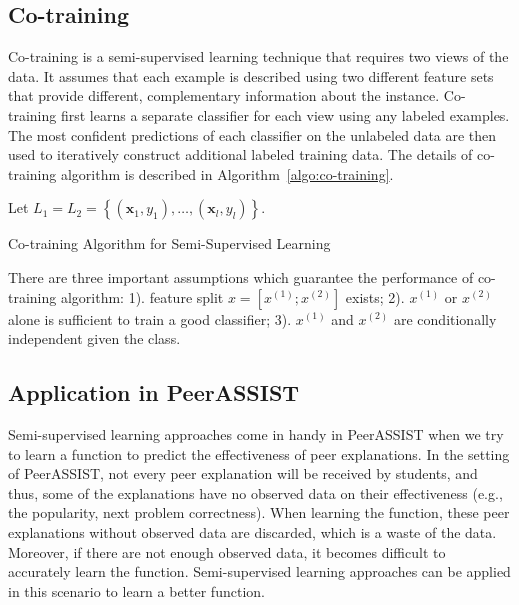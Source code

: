 \documentclass{article}
\begin{document}
\subsection{Co-training}
Co-training \cite{blum1998combining} is a semi-supervised learning technique that requires two
views of the data. It assumes that each example is described using two
different feature sets that provide different, complementary
information about the instance. Co-training first learns a separate
classifier for each view using any labeled examples. The most
confident predictions of each classifier on the unlabeled data are
then used to iteratively construct additional labeled training
data. The details of co-training algorithm is described in Algorithm~\ref{algo:co-training}.
\begin{algorithm}[h] \label{algo:co-training}
Let $L_1 = L_2 = \left \{ (\mathbf{x}_1, y_1), \ldots, (\mathbf{x}_l, y_l)
\right \}.$ \\

\caption{Co-training Algorithm for Semi-Supervised Learning}
\end{algorithm}

There are three important assumptions which guarantee the performance of
co-training algorithm: 1). feature split $x=[x^{(1)};x^{(2)}]$
exists; 2). $x^{(1)}$ or $x^{(2)}$ alone is sufficient to train a good
classifier; 3). $x^{(1)}$ and $x^{(2)}$ are conditionally independent
given the class.

\subsection{Application in PeerASSIST}
Semi-supervised learning approaches come in handy in PeerASSIST when
we try to learn a function to predict the effectiveness of peer
explanations. In the setting of PeerASSIST, not every peer explanation will be received by students,
and thus, some of the explanations have no observed data on their
effectiveness (e.g., the popularity, next problem correctness). When
learning the function, these peer explanations without observed data
are discarded, which is a waste of the data. Moreover, if there are not enough
observed data, it becomes difficult to accurately learn the
function. Semi-supervised learning approaches can be applied in this
scenario to learn a better function.
\end{document}
